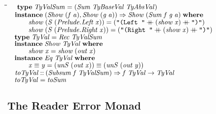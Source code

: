 \documentclass[10pt]{article}
\newlength{\lwidth}\setlength{\lwidth}{4.5cm}
\newlength{\cwidth}\setlength{\cwidth}{8mm} %
\newcommand{\Conid}[1]{\mathit{#1}}
\newcommand{\Varid}[1]{\mathit{#1}}
\newcommand{\plus}{\mathbin{+\!\!\!+}}
\begin{document}
\begin{tabbing}
\qquad\=\hspace{\lwidth}\=\hspace{\cwidth}\=\+\kill
${\hskip1.00em\relax\mathbf{type}\;\Conid{TyValSum}\mathrel{=}(\Conid{Sum}\;\Conid{TyBaseVal}\;\Conid{TyAbsVal})}$\\
${}$\\
${\hskip1.00em\relax\mathbf{instance}\;(\Conid{Show}\;(\Varid{f}\;\Varid{a}),\Conid{Show}\;(\Varid{g}\;\Varid{a}))\Rightarrow \Conid{Show}\;(\Conid{Sum}\;\Varid{f}\;\Varid{g}\;\Varid{a})\;\mathbf{where}}$\\
${\hskip1.00em\relax\hskip2.00em\relax\Varid{show}\;(\Conid{S}\;(\Conid{\Conid{Prelude}.Left}\;\Varid{x}))\mathrel{=}(\text{\tt \char34 (Left~\char34}\plus (\Varid{show}\;\Varid{x})\plus \text{\tt \char34 )\char34})}$\\
${\hskip1.00em\relax\hskip2.00em\relax\Varid{show}\;(\Conid{S}\;(\Conid{\Conid{Prelude}.Right}\;\Varid{x}))\mathrel{=}(\text{\tt \char34 (Right~\char34}\plus (\Varid{show}\;\Varid{x})\plus \text{\tt \char34 )\char34})}$\\
${}$\\
${\hskip1.00em\relax\mathbf{type}\;\Conid{TyVal}\mathrel{=}\Conid{Rec}\;\Conid{TyValSum}}$\\
${}$\\
${\hskip1.00em\relax\mathbf{instance}\;\Conid{Show}\;\Conid{TyVal}\;\mathbf{where}}$\\
${\hskip1.00em\relax\hskip2.00em\relax\Varid{show}\;\Varid{x}\mathrel{=}\Varid{show}\;(\Varid{out}\;\Varid{x})}$\\
${}$\\
${\hskip1.00em\relax\mathbf{instance}\;\Conid{Eq}\;\Conid{TyVal}\;\mathbf{where}}$\\
${\hskip1.00em\relax\hskip2.00em\relax\Varid{x}\equiv \Varid{y}\mathrel{=}(\Varid{unS}\;(\Varid{out}\;\Varid{x}))\equiv (\Varid{unS}\;(\Varid{out}\;\Varid{y}))}$\\
${}$\\
${\hskip1.00em\relax\Varid{toTyVal}\mathbin{::}(\Conid{Subsum}\;\Varid{f}\;\Conid{TyValSum})\Rightarrow \Varid{f}\;\Conid{TyVal}\to \Conid{TyVal}}$\\
${\hskip1.00em\relax\Varid{toTyVal}\mathrel{=}\Varid{toSum}}$
\end{tabbing}
\subsection{The Reader Error Monad}
\end{document}
